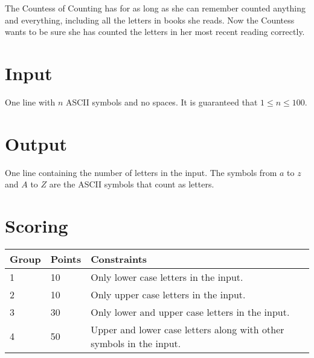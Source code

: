 
The Countess of Counting has for as long as she can remember counted anything and everything,
including all the letters in books she reads.
Now the Countess wants to be sure she has counted the letters in her most recent reading correctly.

\section*{Input}
One line with $n$ ASCII symbols and no spaces.
It is guaranteed that $1 \leq n \leq 100$.

\section*{Output}
One line containing the number of letters in the input.
The symbols from $a$ to $z$ and $A$ to $Z$ are the ASCII symbols that count as letters.

\section*{Scoring}
\begin{tabular}{|l|l|l|} \hline
Group & Points & Constraints \\ \hline
1     & 10   & Only lower case letters in the input. \\ \hline
2     & 10   & Only upper case letters in the input. \\ \hline
3     & 30   & Only lower and upper case letters in the input. \\ \hline
4     & 50   & Upper and lower case letters along with other symbols in the input. \\ \hline
\end{tabular}
